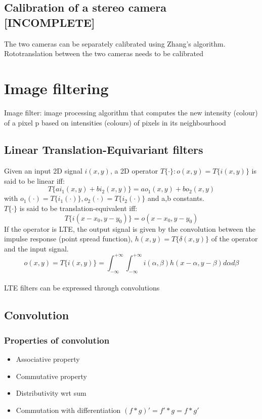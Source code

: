 \documentclass{article}
\begin{document}
\subsection{Calibration of a stereo camera [INCOMPLETE]}
The two cameras can be separately calibrated using Zhang's algorithm.\\
Rototranslation between the two cameras needs to be calibrated

\section{Image filtering}
Image filter: image processing algorithm that computes the new intensity (colour) of a pixel p based on intensities (colours) of pixels in its neighbourhood
\subsection{Linear Translation-Equivariant filters}
Given an input 2D signal $i(x,y)$, a 2D operator $T\{\cdot\}:o(x,y)=T\{i(x,y)\}$ is said to be linear iff:
$$T\{ai_1(x,y)+bi_2(x,y)\}=ao_1(x,y)+bo_2(x,y)$$ with $o_1(\cdot)=T\{i_1(\cdot)\}, o_2(\cdot)=T\{i_2(\cdot)\}$ and a,b constants.\\
$T\{\cdot\}$ is said to be translation-equivalent iff:
$$T\{i(x-x_0,y-y_0)\}=o(x-x_0,y-y_0)$$
If the operator is LTE, the output signal is given by the convolution between the impulse response (point spread function), $h(x,y)=T\{\delta(x,y)\}$ of the operator and the input signal.
$$o(x,y)=T\{i(x,y)\}=\int_{-\infty}^{+\infty} \int_{-\infty}^{+\infty} i(\alpha,\beta)h(x-\alpha,y-\beta)d\alpha d\beta$$\\
LTE filters can be expressed through convolutions

\subsection{Convolution}
\subsubsection{Properties of convolution}
\begin{itemize}
    \item Associative property
    \item Commutative property
    \item Distributivity wrt sum
    \item Commutation with differentiation $(f*g)'=f'*g=f*g'$
\end{itemize}
\end{document}
